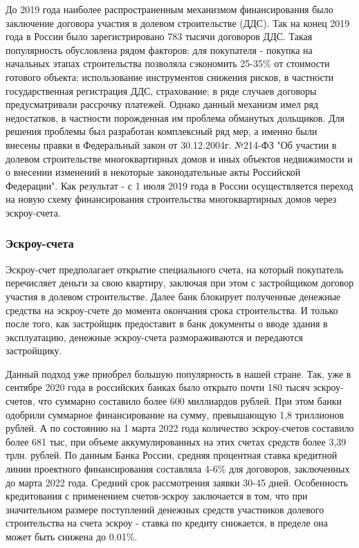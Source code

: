 \documentclass[12pt,a4paper]{article} %
\begin{document}
До 2019 года наиболее распространенным механизмом финансирования было заключение договора участия в долевом строительстве (ДДС). Так на конец 2019 года в России было зарегистрировано 783 тысячи договоров ДДС. Такая популярность обусловлена рядом факторов\cite{domrf}: для покупателя - покупка на начальных этапах строительства позволяла сэкономить 25-35\% от стоимости готового объекта; использование инструментов снижения рисков, в частности государственная регистрация ДДС, страхование; в ряде случаев договоры предусматривали рассрочку платежей. Однако данный механизм имел ряд недостатков, в частности порожденная им проблема обманутых дольщиков. 
Для решения проблемы был разработан комплексный ряд мер, а именно были внесены правки в Федеральный закон от 30.12.2004г. №214-ФЗ "Об участии в долевом строительстве многоквартирных домов и иных объектов недвижимости и о
внесении изменений в некоторые законодательные акты Российской
Федерации". Как результат - с 1 июля 2019 года в России осуществляется переход на новую схему финансирования строительства многоквартирных домов через эскроу-счета.

\subsubsection{Эскроу-счета}

Эскроу-счет предполагает открытие специального счета, на который покупатель перечисляет деньги за свою квартиру, заключая при этом с застройщиком договор участия в долевом строительстве. Далее банк блокирует полученные денежные средства на эскроу-счете до момента окончания срока строительства. И только после того, как застройщик предоставит в банк документы о вводе здания в эксплуатацию, денежные эскроу-счета размораживаются и передаются застройщику.

Данный подход уже приобрел большую популярность в нашей стране. Так, уже в сентябре 2020 года в российских банках было открыто почти 180 тысяч эскроу-счетов, что суммарно составило более 600 миллиардов рублей\cite{Asso}. При этом банки одобрили суммарное финансирование на сумму, превышающую 1,8 триллионов рублей. А по состоянию на 1 марта 2022 года количество эскроу-счетов составило более 681 тыс, при объеме аккумулированных на этих счетах средств более 3,39 трлн. рублей. 
По данным Банка России\cite{cb}, средняя процентная ставка кредитной линии проектного финансирования составляла 4-6\% для договоров, заключенных до марта 2022 года. Средний срок рассмотрения заявки 30-45 дней. Особенность кредитования с применением счетов-эскроу заключается в том, что при значительном размере поступлений денежных средств участников долевого строительства на счета эскроу - ставка по кредиту снижается, в пределе она может быть снижена до 0.01\%.
\end{document}
